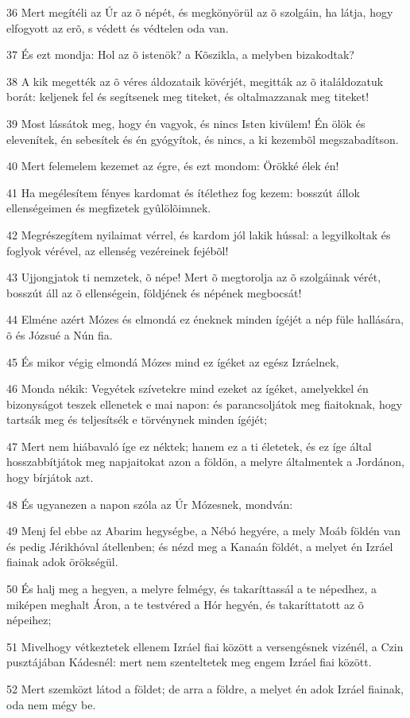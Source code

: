\par 36 Mert megítéli az Úr az õ népét, és megkönyörül az õ szolgáin, ha látja, hogy elfogyott az erõ, s védett és védtelen oda van.
\par 37 És ezt mondja: Hol az õ istenök? a Kõszikla, a melyben bizakodtak?
\par 38 A kik megették az õ véres áldozataik kövérjét, megitták az õ italáldozatuk borát: keljenek fel és segítsenek meg titeket, és oltalmazzanak meg titeket!
\par 39 Most lássátok meg, hogy én vagyok, és nincs Isten kivülem! Én ölök  és elevenítek, én sebesítek és én gyógyítok, és nincs, a ki kezembõl megszabadítson.
\par 40 Mert felemelem kezemet az égre, és ezt mondom: Örökké élek én!
\par 41 Ha megélesítem fényes kardomat és ítélethez fog kezem: bosszút állok ellenségeimen és megfizetek gyûlölõimnek.
\par 42 Megrészegítem nyilaimat vérrel, és kardom jól lakik hússal: a legyilkoltak és foglyok vérével, az ellenség vezéreinek fejébõl!
\par 43 Ujjongjatok ti nemzetek, õ népe! Mert õ megtorolja az õ szolgáinak vérét,  bosszút áll az õ ellenségein, földjének és népének megbocsát!
\par 44 Elméne azért Mózes és elmondá ez éneknek minden ígéjét a nép füle hallására, õ és Józsué a Nún fia.
\par 45 És mikor végig elmondá Mózes mind ez ígéket az egész Izráelnek,
\par 46 Monda nékik: Vegyétek szívetekre mind ezeket az ígéket, amelyekkel én bizonyságot teszek ellenetek e mai napon: és parancsoljátok meg fiaitoknak, hogy tartsák meg és teljesítsék e törvénynek minden ígéjét;
\par 47 Mert nem hiábavaló íge ez néktek; hanem ez a  ti életetek, és ez íge által hosszabbítjátok meg napjaitokat azon a földön, a melyre általmentek a Jordánon, hogy bírjátok azt.
\par 48 És ugyanezen a napon szóla az Úr Mózesnek, mondván:
\par 49 Menj fel ebbe az Abarim hegységbe, a Nébó hegyére, a mely Moáb földén van és pedig Jérikhóval átellenben; és nézd meg a Kanaán földét, a melyet én Izráel fiainak adok örökségül.
\par 50 És halj meg a hegyen, a melyre felmégy, és takaríttassál a te népedhez, a miképen meghalt Áron, a te testvéred a Hór hegyén, és takaríttatott az õ népeihez;
\par 51 Mivelhogy vétkeztetek ellenem Izráel fiai között a versengésnek vizénél, a Czin pusztájában Kádesnél: mert nem szenteltetek meg engem Izráel fiai között.
\par 52 Mert szemközt látod a földet; de arra a földre, a melyet én adok Izráel fiainak, oda nem mégy be.

